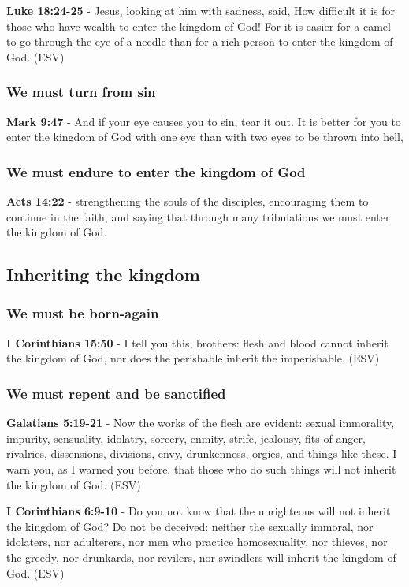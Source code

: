 \documentclass[11pt]{article}
\begin{document}
\textbf{Luke 18:24-25} - Jesus, looking at him with sadness, said, How difficult it is for those who have wealth to enter the kingdom of God! For it is easier for a camel to go through the eye of a needle than for a rich person to enter the kingdom of God. (ESV)

\subsubsection{We must turn from sin}
\label{sec:orgbe84bcf}
\textbf{Mark 9:47} - And if your eye causes you to sin, tear it out. It is better for you to enter the kingdom of God with one eye than with two eyes to be thrown into hell,

\subsubsection{We must endure to enter the kingdom of God}
\label{sec:org4d651b7}
\textbf{Acts 14:22} - strengthening the souls of the disciples, encouraging them to continue in the faith, and saying that through many tribulations we must enter the kingdom of God.

\subsection{Inheriting the kingdom}
\label{sec:org68c9b8e}
\subsubsection{We must be born-again}
\label{sec:org375006e}
\textbf{I Corinthians 15:50} - I tell you this, brothers: flesh and blood cannot inherit the kingdom of God, nor does the perishable inherit the imperishable. (ESV)

\subsubsection{We must repent and be sanctified}
\label{sec:orgee9e9da}
\textbf{Galatians 5:19-21} -  Now the works of the flesh are evident: sexual immorality, impurity, sensuality, idolatry, sorcery, enmity, strife, jealousy, fits of anger, rivalries, dissensions, divisions, envy, drunkenness, orgies, and things like these.  I warn you, as I warned you before, that those who do such things will not inherit the kingdom of God. (ESV)

\textbf{I Corinthians 6:9-10} - Do you not know that the unrighteous will not inherit the kingdom of God? Do not be deceived: neither the sexually immoral, nor idolaters, nor adulterers, nor men who practice homosexuality, nor thieves, nor the greedy, nor drunkards, nor revilers, nor swindlers will inherit the kingdom of God. (ESV)
\end{document}
